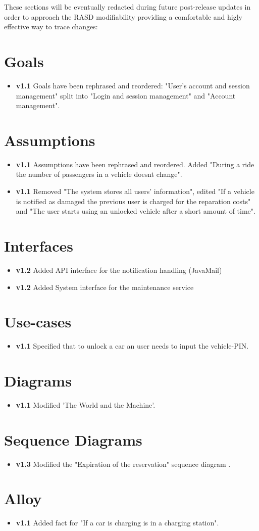 These sections will be eventually redacted during future post-release updates in order to approach the RASD modifiability providing a comfortable and higly effective way to trace changes:

\section{Goals}
	\begin{itemize}
		\item \textbf{v1.1} Goals have been rephrased and reordered: "User’s account and session management" split into "Login and session management" and "Account management".
	\end{itemize}
\section{Assumptions}
	\begin{itemize}
		\item \textbf{v1.1} Assumptions have been rephrased and reordered. Added "During a ride the number of passengers in a vehicle doesnt change".
		\item \textbf{v1.1} Removed "The system stores all users' information", edited "If a vehicle is notified as damaged the previous user is charged for the reparation costs" and "The user starts using an unlocked vehicle after a short amount of time".
	\end{itemize}
\section{Interfaces}
	\begin{itemize}
		\item \textbf{v1.2} Added API interface for the notification handling (JavaMail)
		\item \textbf{v1.2} Added System interface for the maintenance service
	\end{itemize}
\section{Use-cases}
	\begin{itemize}
		\item \textbf{v1.1} Specified that to unlock a car an user needs to input the vehicle-PIN.
	\end{itemize}
\section{Diagrams}
	\begin{itemize}
		\item \textbf{v1.1} Modified 'The World and the Machine'.
	\end{itemize}
\section{Sequence Diagrams}
	\begin{itemize}
		\item \textbf{v1.3} Modified the "Expiration of the reservation" sequence diagram .
	\end{itemize}
\section{Alloy}
	\begin{itemize}
		\item \textbf{v1.1} Added fact for "If a car is charging is in a charging station".
	\end{itemize}